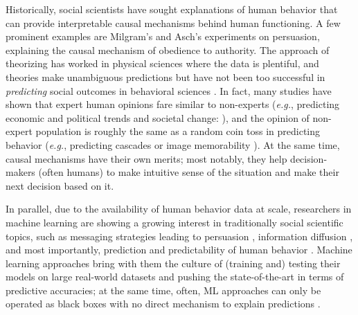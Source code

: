 \documentclass[hidelinks,11pt,a4paper]{report}
\renewcommand{\cite}[1]{\citep{#1}}
\begin{document}
Historically, social scientists have sought explanations of human behavior that can provide interpretable causal mechanisms behind human functioning. A few prominent examples are Milgram's \cite{milgram1978obedience} and Asch's \cite{asch1948doctrine} experiments on persuasion, explaining the causal mechanism of obedience to authority. The approach of theorizing has worked in physical sciences where the data is plentiful, and theories make unambiguous predictions but have not been too successful in \textit{predicting} social outcomes in behavioral sciences \cite{open2015estimating,tetlock2017expert,forecasting2023insights}. In fact, many studies have shown that expert human opinions fare similar to non-experts (\textit{e.g.}, predicting economic and political trends \cite{tetlock2017expert} and societal change: \cite{forecasting2023insights}), and the opinion of non-expert population is roughly the same as a random coin toss in predicting behavior (\textit{e.g.}, predicting cascades \cite{tan2014effect} or image memorability \cite{isola2013makes}). At the same time, causal mechanisms have their own merits; most notably, they help decision-makers (often humans) to make intuitive sense of the situation and make their next decision based on it. 


In parallel, due to the availability of human behavior data at scale, researchers in machine learning are showing a growing interest in traditionally social scientific topics, such as messaging strategies leading to persuasion \cite{habernal2016makes,kumar2023persuasion,luu2019measuring,bhattacharyya-etal-2023-video}, information diffusion \cite{cheng2014can,martin2016exploring}, and most importantly, prediction and predictability of human behavior \cite{choi2012predicting,song2010limits}. Machine learning approaches bring with them the culture of (training and) testing their models on large real-world datasets and pushing the state-of-the-art in terms of predictive accuracies; at the same time, often, ML approaches can only be operated as black boxes with no direct mechanism to explain predictions \cite{salganik2019bit,singla2022audio}.
\end{document}
